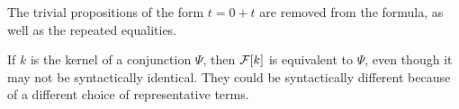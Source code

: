 The trivial propositions of the form $t = 0 + t$ are removed from the formula, as well as the repeated equalities.

If $k$ is the kernel of a conjunction $\Psi$, then $\mathcal{F}[k]$ is equivalent to $\Psi$,
even though it may not be syntactically identical.
They could be syntactically different because of a different choice of representative terms.







